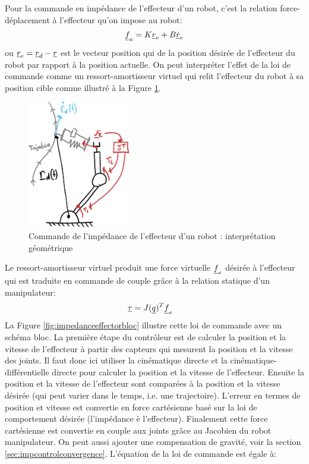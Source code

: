 Pour la commande en impédance de l'effecteur d'un robot, c'est la relation force-déplacement à l'effecteur qu'on impose au robot:
\begin{align}
\underline{f}_e  =  K \underline{r}_e + B \underline{\dot{r}}_e 
\end{align}
ou $\underline{r}_e = \underline{r}_d - \underline{r} $ est le vecteur position qui de la position désirée de l'effecteur du robot par rapport à la position actuelle. On peut interpréter l'effet de la loi de commande comme un ressort-amortisseur virtuel qui relit l'effecteur du robot à sa position cible comme illustré à la Figure \ref{fig:impedanceeffectorgeo}.
\begin{figure}[h]
	\centering
		\includegraphics[width=0.4\textwidth]{fig/impedancecontroleffectorgeo.jpg}
	\caption{Commande de l'impédance de l'effecteur d'un robot : interprétation géométrique}
	\label{fig:impedanceeffectorgeo}
\end{figure}
Le ressort-amortisseur virtuel produit une force virtuelle $\underline{f}_e$ désirée à l'effecteur qui est traduite en commande de couple grâce à la relation statique d'un manipulateur:
\begin{align}
\underline{\tau} &= J(\underline{q})^T \underline{f}_e
\end{align}
La Figure \ref{fig:impedanceeffectorbloc} illustre cette loi de commande avec un schéma bloc. La première étape du contrôleur est de calculer la position et la vitesse de l'effecteur à partir des capteurs qui mesurent la position et la vitesse des joints. Il faut donc ici utiliser la cinématique directe et la cinématique-différentielle directe pour calculer la position et la vitesse de l'effecteur. Ensuite la position et la vitesse de l'effecteur sont comparées à la position et la vitesse désirée (qui peut varier dans le temps, i.e. une trajectoire). L'erreur en termes de position et vitesse est convertie en force cartésienne basé sur la loi de comportement désirée (l'impédance è l'effecteur). Finalement cette force cartésienne est convertie en couple aux joints grâce au Jacobien du robot manipulateur. On peut aussi ajouter une compensation de gravité, voir la section \ref{sec:impcontrolconvergence}. L'équation de la loi de commande est égale à:
